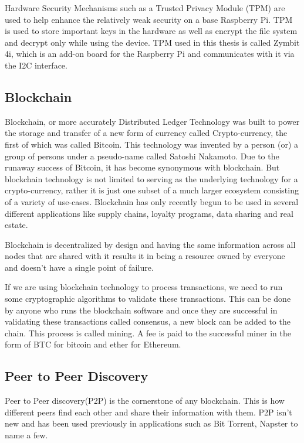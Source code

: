 \documentclass[11pt,openright]{report}
\begin{document}
Hardware Security Mechanisms such as a Trusted Privacy Module (TPM) are used to help enhance the relatively weak security on a base Raspberry Pi. TPM is used to store important keys in the hardware as well as encrypt the file system and decrypt only while using the device. TPM used in this thesis is called Zymbit 4i, which is an add-on board for the Raspberry Pi and communicates with it via the I2C interface.

\subsection{Blockchain}
Blockchain, or more accurately Distributed Ledger Technology was built to power the storage and transfer of a new form of currency called Crypto-currency, the first of which was called Bitcoin. This technology was invented by a person (or) a group of persons under a pseudo-name called Satoshi Nakamoto. Due to the runaway success of Bitcoin, it has become synonymous with blockchain. But blockchain technology is not limited to serving as the underlying technology for a crypto-currency, rather it is just one subset of a much larger ecosystem consisting of a variety of use-cases. Blockchain has only recently begun to be used in several different applications like supply chains, loyalty programs, data sharing and real estate.

Blockchain is decentralized by design and having the same information across all nodes that are shared with it results it in being a resource owned by everyone and doesn’t have a single point of failure. 

If we are using blockchain technology to process transactions, we need to run some cryptographic algorithms to validate these transactions. This can be done by anyone who runs the blockchain software and once they are successful in validating these transactions called consensus, a new block can be added to the chain. This process is called mining. A fee is paid to the successful miner in the form of BTC for bitcoin and ether for Ethereum.

\subsection{Peer to Peer Discovery}
Peer to Peer discovery(P2P) is the cornerstone of any blockchain. This is how different peers find each other and share their information with them. P2P isn't new and has been used previously in applications such as Bit Torrent, Napster to name a few.
\end{document}
